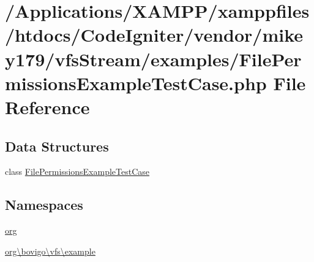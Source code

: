 \hypertarget{_file_permissions_example_test_case_8php}{}\section{/\+Applications/\+X\+A\+M\+P\+P/xamppfiles/htdocs/\+Code\+Igniter/vendor/mikey179/vfs\+Stream/examples/\+File\+Permissions\+Example\+Test\+Case.php File Reference}
\label{_file_permissions_example_test_case_8php}
\subsection*{Data Structures}
\begin{DoxyCompactItemize}
\item 
class \mbox{\hyperlink{classorg_1_1bovigo_1_1vfs_1_1example_1_1_file_permissions_example_test_case}{File\+Permissions\+Example\+Test\+Case}}
\end{DoxyCompactItemize}
\subsection*{Namespaces}
\begin{DoxyCompactItemize}
\item 
 \mbox{\hyperlink{namespaceorg}{org}}
\item 
 \mbox{\hyperlink{namespaceorg_1_1bovigo_1_1vfs_1_1example}{org\textbackslash{}bovigo\textbackslash{}vfs\textbackslash{}example}}
\end{DoxyCompactItemize}
